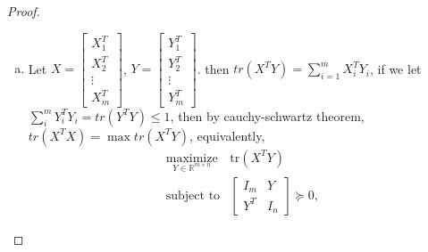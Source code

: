 \documentclass{article}
\theoremstyle{remark}
\theoremstyle{definition}
\newcommand{\maximize}{\mathop{\mathrm{maximize}}}
\newcommand{\maximizewrt}[1]{\underset{#1}{\maximize}}
\newcommand{\subjectto}{\mbox{subject to}}
\def\tr{\mathrm{tr}}
\begin{document}
\begin{proof}
\begin{enumerate}[(a)]
    \item Let $X=\begin{bmatrix} X_1^T\\ X_2^T\\ \vdots \\ X_m^T\end{bmatrix}$, $Y=\begin{bmatrix}Y_1^T\\ Y_2^T\\ \vdots \\ Y_m^T\end{bmatrix}$. then $tr(X^TY)=\sum_{i=1}^m X_i^TY_i$, if we let $\sum_i^m Y^T_iY_i=tr(Y^TY)\leq 1$, then by cauchy-schwartz theorem, $ tr(X^TX)=\max tr(X^TY)$, equivalently,
     \begin{equation*}
\begin{array}{ll}
\maximizewrt{Y \in \mathbb{R}^{m \times n}} & \tr(X^T Y) \\
\subjectto & 
\left[
\begin{array}{cc}
I_m & Y \\
Y^T & I_n
\end{array}
\right]
\succeq 0,
\end{array}
\label{eq:aa:primal}
\end{equation*}


\end{enumerate}
\end{proof}
\end{document}
